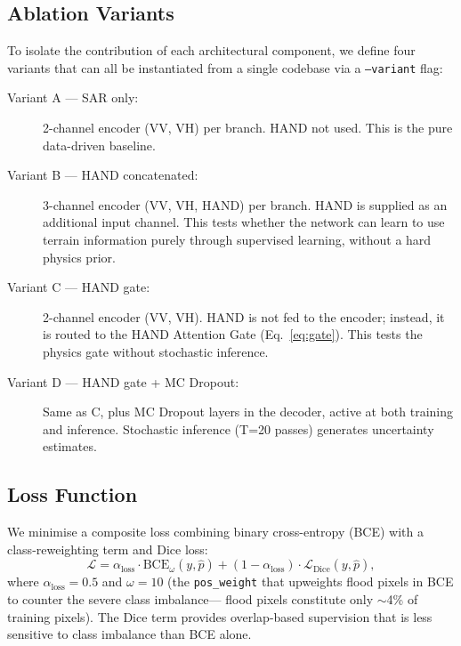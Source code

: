 \documentclass[12pt]{article}
\begin{document}
\subsection{Ablation Variants}
\label{sec:variants}

To isolate the contribution of each architectural component, we define four
variants that can all be instantiated from a single codebase via a
\texttt{--variant} flag:

\begin{description}
  \item[Variant A — SAR only:]  2-channel encoder (VV, VH) per branch.
        HAND not used.  This is the pure data-driven baseline.

  \item[Variant B — HAND concatenated:]  3-channel encoder (VV, VH, HAND)
        per branch.  HAND is supplied as an additional input channel.
        This tests whether the network can learn to use terrain information
        purely through supervised learning, without a hard physics prior.

  \item[Variant C — HAND gate:]  2-channel encoder (VV, VH).
        HAND is not fed to the encoder; instead, it is routed to the HAND
        Attention Gate (Eq.~\ref{eq:gate}).  This tests the physics gate
        without stochastic inference.

  \item[Variant D — HAND gate + MC Dropout:]  Same as C, plus MC Dropout
        layers in the decoder, active at both training and inference.
        Stochastic inference (T=20 passes) generates uncertainty estimates.
\end{description}

\subsection{Loss Function}

We minimise a composite loss combining binary cross-entropy (BCE) with a
class-reweighting term and Dice loss:
\begin{equation}
  \mathcal{L} = \alpha_\text{loss} \cdot \mathrm{BCE}_{\omega}(y, \hat{p})
              + (1 - \alpha_\text{loss}) \cdot \mathcal{L}_\text{Dice}(y, \hat{p}),
  \label{eq:loss}
\end{equation}
where $\alpha_\text{loss} = 0.5$ and $\omega = 10$ (the \texttt{pos\_weight}
that upweights flood pixels in BCE to counter the severe class imbalance—
flood pixels constitute only $\sim$4\% of training pixels).  The Dice term
provides overlap-based supervision that is less sensitive to class imbalance
than BCE alone.
\end{document}
